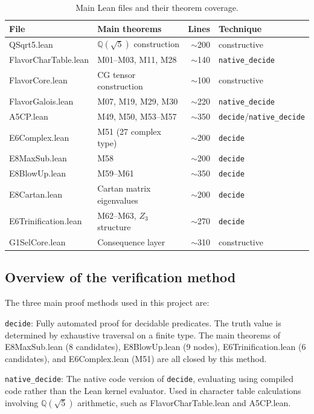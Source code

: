 \documentclass[sn-mathphys-num,Numbered]{sn-jnl}
\theoremstyle{thmstyleone}
\theoremstyle{thmstylethree}
\begin{document}
\begin{appendices}
\begin{table}[htb]
\centering
\caption{Main Lean files and their theorem coverage.}\label{tab:lean-files}
\begin{tabular}{llrl}
\toprule
File & Main theorems & Lines & Technique \\
\midrule
QSqrt5.lean & $\mathbb{Q}(\sqrt{5})$ construction & $\sim$200 & constructive \\
FlavorCharTable.lean & M01--M03, M11, M28 & $\sim$140 & \texttt{native\_decide} \\
FlavorCore.lean & CG tensor construction & $\sim$100 & constructive \\
FlavorGalois.lean & M07, M19, M29, M30 & $\sim$220 & \texttt{native\_decide} \\
A5CP.lean & M49, M50, M53--M57 & $\sim$350 & \texttt{decide}/\texttt{native\_decide} \\
E6Complex.lean & M51 (27 complex type) & $\sim$200 & \texttt{decide} \\
E8MaxSub.lean & M58 & $\sim$200 & \texttt{decide} \\
E8BlowUp.lean & M59--M61 & $\sim$350 & \texttt{decide} \\
E8Cartan.lean & Cartan matrix eigenvalues & $\sim$200 & \texttt{decide} \\
E6Trinification.lean & M62--M63, $Z_3$ structure & $\sim$270 & \texttt{decide} \\
G1SelCore.lean & Consequence layer & $\sim$310 & constructive \\
\bottomrule
\end{tabular}
\end{table}


\subsection{Overview of the verification method}

The three main proof methods used in this project are:

\texttt{decide}: Fully automated proof for decidable predicates.  The truth
value is determined by exhaustive traversal on a finite type.  The main
theorems of E8MaxSub.lean (8 candidates), E8BlowUp.lean (9 nodes),
E6Trinification.lean (6 candidates), and E6Complex.lean (M51) are all closed
by this method.

\texttt{native\_decide}: The native code version of \texttt{decide},
evaluating using compiled code rather than the Lean kernel evaluator.  Used in
character table calculations involving $\mathbb{Q}(\sqrt{5})$ arithmetic, such
as FlavorCharTable.lean and A5CP.lean.


\end{appendices}
\end{document}
